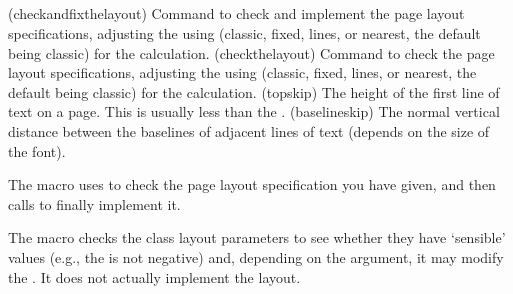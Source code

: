 \begin{syntax}
\cmd{\checkandfixthelayout} \\
\cmd{\checkthelayout} \\
\cmd{\fixthelayout} \\
\lnc{\baselineskip} \lnc{\topskip} \\
\end{syntax}
\glossary(checkandfixthelayout)%
  {}%
  {Command to check and implement the page layout specifications, adjusting
   the  using  
   (classic, fixed, lines, or nearest, the default being classic) 
   for the calculation.}%
\glossary(checkthelayout)%
  {}%
  {Command to check the page layout specifications, adjusting
   the  using  
   (classic, fixed, lines, or nearest, the default being classic) 
   for the calculation.}%
\glossary(topskip)%
  {}%
  {The height of the first line of text on a page. This is usually
   less than the .}
\glossary(baselineskip)%
  {}%
  {The normal vertical distance between the baselines of adjacent lines 
   of text (depends on the size of the font).}

    The \cmd{\checkandfixthelayout} macro uses 
\cmd{\checkthelayout} to
check the page layout specification you have given, and then calls
\cmd{\fixthelayout} to finally implement it.

The \cmd{\checkthelayout} macro checks the class layout 
parameters to see whether  
they have `sensible' values (e.g., the \lnc{\textwidth} is not negative)
and, depending on the  argument, it may modify the 
\lnc{\textheight}. It does not actually implement the layout.

